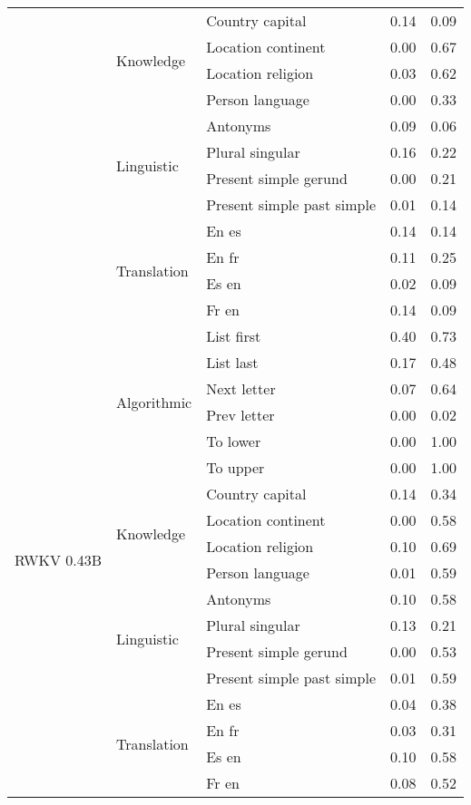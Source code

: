 \begin{center}
\begin{longtable}{lllrr}
 & \multirow[t]{4}{*}{Knowledge} & Country capital & 0.14 & 0.09 \\
 &  & Location continent & 0.00 & 0.67 \\
 &  & Location religion & 0.03 & 0.62 \\
 &  & Person language & 0.00 & 0.33 \\
\cline{2-5}
 & \multirow[t]{4}{*}{Linguistic} & Antonyms & 0.09 & 0.06 \\
 &  & Plural singular & 0.16 & 0.22 \\
 &  & Present simple gerund & 0.00 & 0.21 \\
 &  & Present simple past simple & 0.01 & 0.14 \\
\cline{2-5}
 & \multirow[t]{4}{*}{Translation} & En es & 0.14 & 0.14 \\
 &  & En fr & 0.11 & 0.25 \\
 &  & Es en & 0.02 & 0.09 \\
 &  & Fr en & 0.14 & 0.09 \\
\cline{1-5} \cline{2-5}
\multirow[t]{18}{*}{RWKV 0.43B} & \multirow[t]{6}{*}{Algorithmic} & List first & 0.40 & 0.73 \\
 &  & List last & 0.17 & 0.48 \\
 &  & Next letter & 0.07 & 0.64 \\
 &  & Prev letter & 0.00 & 0.02 \\
 &  & To lower & 0.00 & 1.00 \\
 &  & To upper & 0.00 & 1.00 \\
\cline{2-5}
 & \multirow[t]{4}{*}{Knowledge} & Country capital & 0.14 & 0.34 \\
 &  & Location continent & 0.00 & 0.58 \\
 &  & Location religion & 0.10 & 0.69 \\
 &  & Person language & 0.01 & 0.59 \\
\cline{2-5}
 & \multirow[t]{4}{*}{Linguistic} & Antonyms & 0.10 & 0.58 \\
 &  & Plural singular & 0.13 & 0.21 \\
 &  & Present simple gerund & 0.00 & 0.53 \\
 &  & Present simple past simple & 0.01 & 0.59 \\
\cline{2-5}
 & \multirow[t]{4}{*}{Translation} & En es & 0.04 & 0.38 \\
 &  & En fr & 0.03 & 0.31 \\
 &  & Es en & 0.10 & 0.58 \\
 &  & Fr en & 0.08 & 0.52 \\

\end{longtable}
\end{center}
